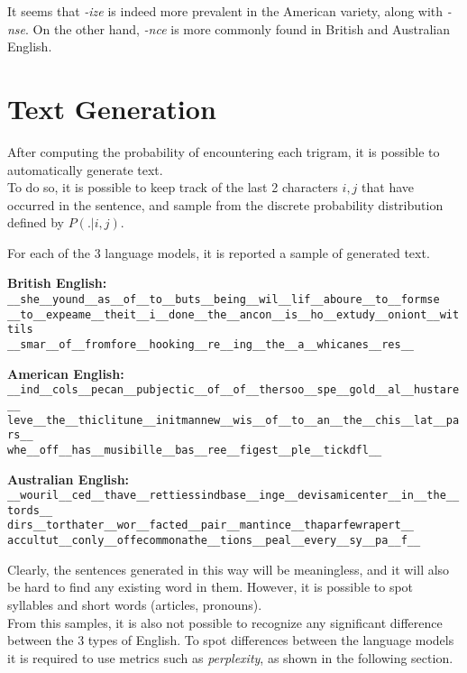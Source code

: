 \documentclass[
12pt,
a4paper,
oneside,
headinclude,
footinclude]{article}
\theoremstyle{definition} %
\begin{document}
It seems that \textit{-ize} is indeed more prevalent in the American variety, along with \textit{-nse}. On the other hand,  \textit{-nce} is more commonly found in British and Australian English.

\section{Text Generation}
After computing the probability of encountering each trigram, it is possible to automatically generate text.\\
To do so, it is possible to keep track of the last 2 characters $i, j$ that have occurred in the sentence, and sample from the discrete probability distribution defined by $P(. | i, j)$.

For each of the 3 language models, it is reported a sample of generated text.

\textbf{British English:}\\
\texttt{\_\_she\_\_yound\_\_as\_\_of\_\_to\_\_buts\_\_being\_\_wil\_\_lif\_\_aboure\_\_to\_\_formse\\
    \_\_to\_\_expeame\_\_theit\_\_i\_\_done\_\_the\_\_ancon\_\_is\_\_ho\_\_extudy\_\_oniont\_\_wittils\\
    \_\_smar\_\_of\_\_fromfore\_\_hooking\_\_re\_\_ing\_\_the\_\_a\_\_whicanes\_\_res\_\_}

\textbf{American English:}\\
\texttt{\_\_ind\_\_cols\_\_pecan\_\_pubjectic\_\_of\_\_of\_\_thersoo\_\_spe\_\_gold\_\_al\_\_hustare\_\_\\
    leve\_\_the\_\_thiclitune\_\_initmannew\_\_wis\_\_of\_\_to\_\_an\_\_the\_\_chis\_\_lat\_\_pars\_\_\\
    whe\_\_off\_\_has\_\_musibille\_\_bas\_\_ree\_\_figest\_\_ple\_\_tickdfl\_\_}

\textbf{Australian English:}\\
\texttt{\_\_wouril\_\_ced\_\_thave\_\_rettiessindbase\_\_inge\_\_devisamicenter\_\_in\_\_the\_\_tords\_\_\\
    dirs\_\_torthater\_\_wor\_\_facted\_\_pair\_\_mantince\_\_thaparfewrapert\_\_\\
    accultut\_\_conly\_\_offecommonathe\_\_tions\_\_peal\_\_every\_\_sy\_\_pa\_\_f\_\_}

Clearly, the sentences generated in this way will be meaningless, and it will also be hard to find any existing word in them. However, it is possible to spot syllables and short words (articles, pronouns).\\
From this samples, it is also not possible to recognize any significant difference between the 3 types of English. To spot differences between the language models it is required to use metrics such as \textit{perplexity}, as shown in the following section.
\end{document}
